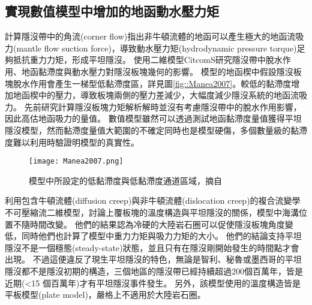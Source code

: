 \subsection{實現數值模型中增加的地函動水壓力矩}
\citealp{tovish1978mantle}計算隱沒帶中的角流(corner flow)指出非牛頓流體的地函可以產生極大的地函流吸力(mantle flow suction force)，導致動水壓力矩(hydrodynamic pressure torque)足夠抵抗重力力矩，形成平坦隱沒。
\citealp{Manea2007}使用二維模型CitcomS研究隱沒帶中脫水作用、地函黏滯度與動水壓力對隱沒板塊幾何的影響。
模型的地函楔中假設隱沒板塊脫水作用會產生一梯型低黏滯度區，詳見圖\ref{fig::Manea2007}。較低的黏滯度增加地函楔中的壓力，導致板塊兩側的壓力差減少，大幅度減少隱沒系統的地函流吸力。
先前研究計算隱沒板塊力矩解析解時並沒有考慮隱沒帶中的脫水作用影響，因此高估地函吸力的量值。
數值模型雖然可以透過測試地函黏滯度量值獲得平坦隱沒模型，然而黏滯度量值大範圍的不確定同時也是模型硬傷，多個數量級的黏滯度難以利用時驗證明模型的真實性。

\begin{figure*}[ht!]
    \centering
    \texttt{[image: Manea2007.png]}
    \caption[\citealp{Manea2007}模型中所設定的低黏滯度與低黏滯度通道區域，摘自\citealp{Manea2007}]{\citealp{Manea2007}模型中所設定的低黏滯度與低黏滯度通道區域，摘自\citealp{Manea2007}}
    \label{}
\end{figure*}

\citealp{Thermal2012}利用包含牛頓流體(diffusion creep)與非牛頓流體(dislocation creep)的複合流變學不可壓縮流二維模型，討論上覆板塊的溫度構造與平坦隱沒的關係，模型中海溝位置不隨時間改變。
他們的結果認為冷硬的大陸岩石圈可以促使隱沒板塊角度變低，同時他們也計算了模型中重力力矩與吸力力矩的大小。
他們的結論支持平坦隱沒不是一個穩態(steady-state)狀態，並且只有在隱沒剛開始發生的時間點才會出現。
不過這便違反了現生平坦隱沒的特色，無論是智利、秘魯或墨西哥的平坦隱沒都不是隱沒初期的構造，三個地區的隱沒帶已經持續超過200個百萬年，皆是近期(<15 個百萬年)才有平坦隱沒事件發生。
另外，該模型使用的溫度構造皆是平板模型(plate model)，嚴格上不適用於大陸岩石圈。


